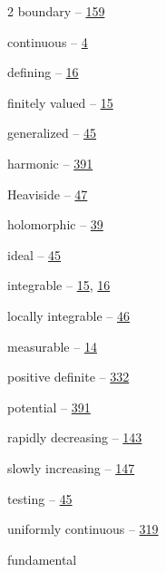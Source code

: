 \begin{multicols}{2}
\hspace*{1.1em}boundary -- \hyperlink{page.159}{159}\par
\hspace*{1.1em}continuous -- \hyperlink{page.4}{4}\par
\hspace*{1.1em}defining -- \hyperlink{page.16}{16}\par
\hspace*{1.1em}finitely valued -- \hyperlink{page.15}{15}\par
\hspace*{1.1em}generalized -- \hyperlink{page.45}{45}\par
\hspace*{1.1em}harmonic -- \hyperlink{page.391}{391}\par
\hspace*{1.1em}Heaviside -- \hyperlink{page.47}{47}\par
\hspace*{1.1em}holomorphic -- \hyperlink{page.39}{39}\par
\hspace*{1.1em}ideal -- \hyperlink{page.45}{45}\par
\hspace*{1.1em}integrable -- \hyperlink{page.15}{15}, \hyperlink{page.16}{16}\par
\hspace*{1.1em}locally integrable -- \hyperlink{page.46}{46}\par
\hspace*{1.1em}measurable -- \hyperlink{page.14}{14}\par
\hspace*{1.1em}positive definite -- \hyperlink{page.332}{332}\par
\hspace*{1.1em}potential -- \hyperlink{page.391}{391}\par
\hspace*{1.1em}rapidly decreasing -- \hyperlink{page.143}{143}\par
\hspace*{1.1em}slowly increasing -- \hyperlink{page.147}{147}\par
\hspace*{1.1em}testing -- \hyperlink{page.45}{45}\par
\hspace*{1.1em}uniformly continuous -- \hyperlink{page.319}{319}\par
\noindent fundamental\par

\end{multicols}
